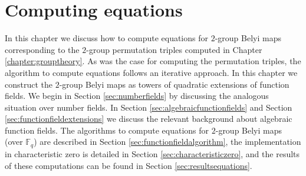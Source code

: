 \documentclass{dcthesis}
\newcommand{\CC}{\mathbb C}
\newcommand{\wt}[1]{\widetilde{#1}}
\newcommand{\FF}{\mathbb{F}}
\DeclareMathOperator{\charpoly}{charpoly}
\numberwithin{equation}{section}
\theoremstyle{definition}
\theoremstyle{remark}
\begin{document}
{{    %
}
\chapter{Computing equations}{\label{chapter:equations}
  In this chapter we discuss how to compute
  equations for $2$-group Belyi maps
  corresponding to the $2$-group
  permutation triples
  computed in Chapter
  \ref{chapter:grouptheory}.
  As was the case for computing the permutation
  triples,
  the algorithm to compute equations follows an
  iterative approach.
  In this chapter we
  construct the $2$-group Belyi maps
  as towers of quadratic extensions
  of function fields.
  We begin in Section
  \ref{sec:numberfields}
  by discussing the analogous situation
  over number fields.
  In Section \ref{sec:algebraicfunctionfields}
  and Section \ref{sec:functionfieldextensions}
  we discuss the relevant
  background about algebraic function fields.
  The algorithms to compute
  equations for
  $2$-group Belyi maps
  (over $\FF_q$)
  are described in Section
  \ref{sec:functionfieldalgorithm},
  the implementation in characteristic zero
  is detailed in Section
  \ref{sec:characteristiczero},
  and the results of these computations
  can be found in
  Section
  \ref{sec:resultsequations}.
}}
\end{document}
